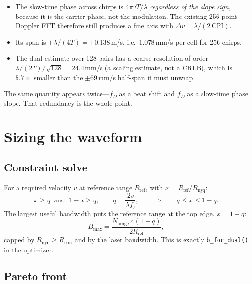 \documentclass[11pt,a4paper]{article}
\newcommand{\fs}{f_s}
\newcommand{\Rnyq}{R_{\mathrm{nyq}}}
\newcommand{\CPI}{\mathrm{CPI}}
\begin{document}
\begin{itemize}
\item The slow-time phase across chirps is $4\pi vT/\lambda$ \emph{regardless of
the slope sign}, because it is the carrier phase, not the modulation. The
existing 256-point Doppler FFT therefore still produces a fine axis with
$\Delta v = \lambda/(2\,\CPI)$.
\item Its span is $\pm\lambda/(4T) = \pm0.138$\,m/s, i.e.\ 1.078\,mm/s per cell
for 256 chirps.
\item The dual estimate over 128 pairs has a coarse resolution of order
$\lambda/(2T)/\sqrt{128} = 24.4$\,mm/s (a scaling estimate, not a CRLB), which
is $5.7\times$ smaller than the $\pm69$\,mm/s half-span it must unwrap.
\end{itemize}

The same quantity appears twice---$f_D$ as a beat shift and $f_D$ as a
slow-time phase slope. That redundancy is the whole point.

\section{Sizing the waveform}

\subsection{Constraint solve}
For a required velocity $v$ at reference range $R_{\text{ref}}$, with
$x=R_{\text{ref}}/\Rnyq$:
\begin{equation}
x \ge q \ \text{ and }\ 1-x \ge q, \qquad q = \frac{2v}{\lambda\fs},
\qquad\Longrightarrow\qquad q \le x \le 1-q .
\end{equation}
The largest useful bandwidth puts the reference range at the top edge,
$x=1-q$:
\begin{equation}
B_{\max} = \frac{N_{\text{range}}\,c\,(1-q)}{2R_{\text{ref}}},
\end{equation}
capped by $\Rnyq \ge R_{\min}$ and by the laser bandwidth. This is exactly
\texttt{b\_for\_dual()} in the optimizer.

\subsection{Pareto front}
\end{document}
